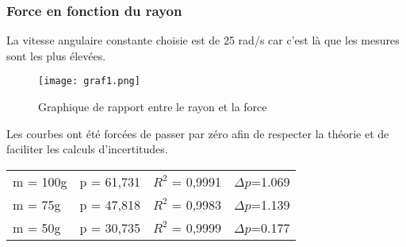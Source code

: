 \subsubsection{Force en fonction du rayon}

La vitesse angulaire constante choisie est de 25 rad/s car c’est là que les mesures sont les plus élevées.

\begin{figure}[!h]
    \caption[Graphique rayon force]{Graphique de rapport entre le rayon et la force}
    \centering
    \texttt{[image: graf1.png]}
\end{figure}

Les courbes ont été forcées de passer par zéro afin de respecter la théorie et de faciliter les calculs d'incertitudes.
\begin{table}[ht]
    \centering
    \begin{tabular}{l l l l}
    m = 100g & p = 61,731 & $R^2$ = 0,9991 & $\Delta p$=1.069\\
    m = 75g  & p = 47,818 & $R^2$ = 0,9983 & $\Delta p$=1.139\\
    m = 50g  & p = 30,735 & $R^2$ = 0,9999 & $\Delta p$=0.177\\
    \end{tabular}
\end{table}

